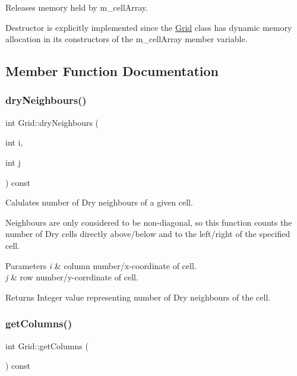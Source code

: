 Releases memory held by m\+\_\+cell\+Array. 

Destructor is explicitly implemented since the \hyperlink{class_grid}{Grid} class has dynamic memory allocation in its constructors of the m\+\_\+cell\+Array member variable. 

\subsection{Member Function Documentation}
\mbox{\label{class_grid_a50f4c0db20b466c84a1d65004e51642e}} 
\subsubsection{\texorpdfstring{dry\+Neighbours()}{dryNeighbours()}}
{\footnotesize\ttfamily int Grid\+::dry\+Neighbours (\begin{DoxyParamCaption}\item[{int}]{i,  }\item[{int}]{j }\end{DoxyParamCaption}) const}



Calulates number of Dry neighbours of a given cell. 

Neighbours are only considered to be non-\/diagonal, so this function counts the number of Dry cells directly above/below and to the left/right of the specified cell.


\begin{DoxyParams}{Parameters}
{\em i} & column number/x-\/coordinate of cell. \\
\hline
{\em j} & row number/y-\/corrdinate of cell.\\
\hline
\end{DoxyParams}
\begin{DoxyReturn}{Returns}
Integer value representing number of Dry neighbours of the cell. 
\end{DoxyReturn}
\mbox{\label{class_grid_aee0114021b6858483965cc1bffd7b88b}} 
\subsubsection{\texorpdfstring{get\+Columns()}{getColumns()}}
{\footnotesize\ttfamily int Grid\+::get\+Columns (\begin{DoxyParamCaption}{ }\end{DoxyParamCaption}) const}



